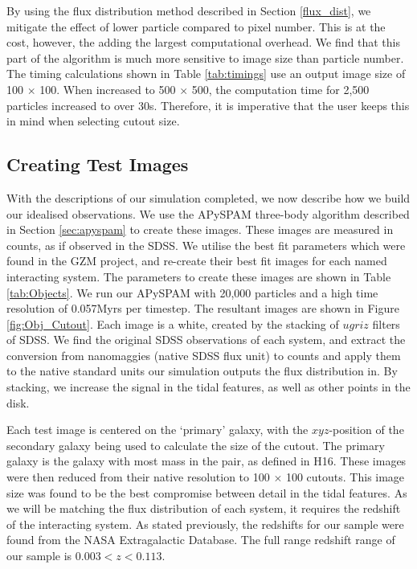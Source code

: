 By using the flux distribution method described in Section \ref{flux_dist}, we mitigate the effect of lower particle compared to pixel number. This is at the cost, however, the adding the largest computational overhead. We find that this part of the algorithm is much more sensitive to image size than particle number. The timing calculations shown in Table \ref{tab:timings} use an output image size of 100 $\times$ 100. When increased to 500 $\times$ 500, the computation time for 2,500 particles increased to over 30s. Therefore, it is imperative that the user keeps this in mind when selecting cutout size.

\subsection{Creating Test Images}\label{sec:syn_sample}
With the descriptions of our simulation completed, we now describe how we build our idealised observations. We use the APySPAM three-body algorithm described in Section \ref{sec:apyspam} to create these images. These images are measured in counts, as if observed in the SDSS. We utilise the best fit parameters which were found in the GZM project, and re-create their best fit images for each named interacting system. The parameters to create these images are shown in Table \ref{tab:Objects}. We run our APySPAM with 20,000 particles and a high time resolution of 0.057Myrs per timestep. The resultant images are shown in Figure \ref{fig:Obj_Cutout}. Each image is a white, created by the stacking of $ugriz$ filters of SDSS. We find the original SDSS observations of each system, and extract the conversion from nanomaggies (native SDSS flux unit) to counts and apply them to the native standard units our simulation outputs the flux distribution in. By stacking, we increase the signal in the tidal features, as well as other points in the disk. 

Each test image is centered on the `primary' galaxy, with the $xyz$-position of the secondary galaxy being used to calculate the size of the cutout. The primary galaxy is the galaxy with most mass in the pair, as defined in H16. These images were then reduced from their native resolution to 100 $\times$ 100 cutouts. This image size was found to be the best compromise between detail in the tidal features. As we will be matching the flux distribution of each system, it requires the redshift of the interacting system. As stated previously, the redshifts for our sample were found from the NASA Extragalactic Database. The full range redshift range of our sample is $0.003 < z < 0.113$.

